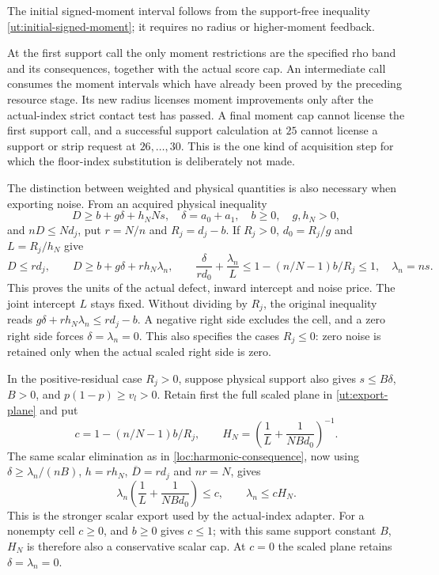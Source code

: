 \documentclass[aop,preprint]{imsart}
\theoremstyle{definition}
\numberwithin{equation}{section}
\begin{document}
The initial signed-moment interval follows from the support-free
inequality \eqref{ut:initial-signed-moment}; it requires no radius
or higher-moment feedback.

At the first support call the only moment restrictions are the
specified rho band and its consequences, together with the actual
score cap. An intermediate call consumes the moment intervals which
have already been proved by the preceding resource stage. Its new
radius licenses moment improvements only after the actual-index
strict contact test has passed. A final moment cap cannot license
the first support call, and a successful support calculation at $25$
cannot license a support or strip request at $26,\ldots,30$.
This is the one kind of acquisition step for which the floor-index
substitution is deliberately not made.

The distinction between weighted and physical quantities is also
necessary when exporting noise. From an acquired physical inequality
\[
 D\ge b+g\delta+h_NNs,\quad
 \delta=a_0+a_1,\quad b\ge0,\quad g,h_N>0,
\]
and $nD\le Nd_j$, put $r=N/n$ and $R_j=d_j-b$.
If $R_j>0$, $d_0=R_j/g$ and $L=R_j/h_N$ give
\begin{equation}\label{ut:export-plane}
 D\le rd_j,\qquad
 D\ge b+g\delta+rh_N\lambda_n,\qquad
 \frac{\delta}{rd_0}+\frac{\lambda_n}{L}
                 \le1-(n/N-1)b/R_j\le1,
 \quad\lambda_n=ns.
\end{equation}
This proves the units of the actual defect, inward intercept and noise
price. The joint intercept $L$ stays fixed. Without dividing by $R_j$,
the original inequality reads
$g\delta+rh_N\lambda_n\le rd_j-b$.
A negative right side excludes the cell, and a zero right side forces
$\delta=\lambda_n=0$. This also specifies the cases $R_j\le0$:
zero noise is retained only when the actual scaled right side is zero.

In the positive-residual case $R_j>0$, suppose physical support also gives $s\le B\delta$,
$B>0$, and $p(1-p)\ge v_l>0$. Retain first the full scaled
plane in \eqref{ut:export-plane} and put
\[
 c=1-(n/N-1)b/R_j,\qquad
 H_N=\left(\frac1L+\frac1{NBd_0}\right)^{-1}.
\]
The same scalar elimination as in \eqref{loc:harmonic-consequence},
now using $\delta\ge\lambda_n/(nB)$, $h=rh_N$,
$\overline D=rd_j$ and $nr=N$, gives
\begin{equation}\label{ut:scaled-harmonic}
 \lambda_n\left(\frac1L+\frac1{NBd_0}\right)\le c,
 \qquad \lambda_n\le cH_N.
\end{equation}
This is the stronger scalar export used by the actual-index adapter.
For a nonempty cell $c\ge0$, and $b\ge0$ gives $c\le1$;
with this same support constant $B$, $H_N$ is therefore also
a conservative scalar cap. At $c=0$ the scaled plane retains
$\delta=\lambda_n=0$.
\end{document}

